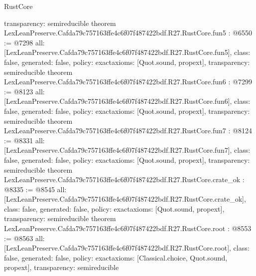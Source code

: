 \begin{lexlean}{RustCore}
\begin{coremodule}
{  transparency: semireducible
}
theorem LexLeanPreserve.Cafda79c757163ffe4c6f07f487422bdf.R27.RustCore.fun5 : @6550 := @7298 {
  all: [LexLeanPreserve.Cafda79c757163ffe4c6f07f487422bdf.R27.RustCore.fun5],
  class: false,
  generated: false,
  policy: exact{axioms: [Quot.sound, propext]},
  transparency: semireducible
}
theorem LexLeanPreserve.Cafda79c757163ffe4c6f07f487422bdf.R27.RustCore.fun6 : @7299 := @8123 {
  all: [LexLeanPreserve.Cafda79c757163ffe4c6f07f487422bdf.R27.RustCore.fun6],
  class: false,
  generated: false,
  policy: exact{axioms: [Quot.sound, propext]},
  transparency: semireducible
}
theorem LexLeanPreserve.Cafda79c757163ffe4c6f07f487422bdf.R27.RustCore.fun7 : @8124 := @8331 {
  all: [LexLeanPreserve.Cafda79c757163ffe4c6f07f487422bdf.R27.RustCore.fun7],
  class: false,
  generated: false,
  policy: exact{axioms: [Quot.sound, propext]},
  transparency: semireducible
}
theorem LexLeanPreserve.Cafda79c757163ffe4c6f07f487422bdf.R27.RustCore.crate_ok : @8335 := @8545 {
  all: [LexLeanPreserve.Cafda79c757163ffe4c6f07f487422bdf.R27.RustCore.crate_ok],
  class: false,
  generated: false,
  policy: exact{axioms: [Quot.sound, propext]},
  transparency: semireducible
}
theorem LexLeanPreserve.Cafda79c757163ffe4c6f07f487422bdf.R27.RustCore.root : @8553 := @8563 {
  all: [LexLeanPreserve.Cafda79c757163ffe4c6f07f487422bdf.R27.RustCore.root],
  class: false,
  generated: false,
  policy: exact{axioms: [Classical.choice, Quot.sound, propext]},
  transparency: semireducible
}


\end{coremodule}
\end{lexlean}
